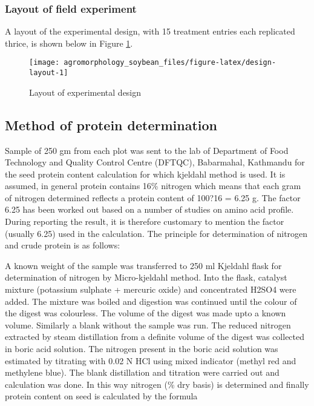 \documentclass[
]{article}
\begin{document}
\hypertarget{layout-of-field-experiment}{%
\subsubsection{Layout of field experiment}\label{layout-of-field-experiment}}

A layout of the experimental design, with 15 treatment entries each replicated thrice, is shown below in Figure \ref{fig:design-layout}.

\begin{figure}

{\centering \texttt{[image: agromorphology\_soybean\_files/figure-latex/design-layout-1]} 

}

\caption{Layout of experimental design}\label{fig:design-layout}
\end{figure}

\hypertarget{method-of-protein-determination}{%
\subsection{Method of protein determination}\label{method-of-protein-determination}}

Sample of 250 gm from each plot was sent to the lab of Department of Food Technology and Quality Control Centre (DFTQC), Babarmahal, Kathmandu for the seed protein content calculation for which kjeldahl method is used. It is assumed, in general protein contains 16\% nitrogen which means that each gram of nitrogen determined reflects a protein content of 100?16 = 6.25 g. The factor 6.25 has been worked out based on a number of studies on amino acid profile. During reporting the result, it is therefore customary to mention the factor (usually 6.25) used in the calculation. The principle for determination of nitrogen and crude protein is as follows:

A known weight of the sample was transferred to 250 ml Kjeldahl flask for determination of nitrogen by Micro-kjeldahl method. Into the flask, catalyst mixture (potassium sulphate + mercuric oxide) and concentrated H2SO4 were added. The mixture was boiled and digestion was continued until the colour of the digest was colourless. The volume of the digest was made upto a known volume. Similarly a blank without the sample was run. The reduced nitrogen extracted by steam distillation from a definite volume of the digest was collected in boric acid solution. The nitrogen present in the boric acid solution was estimated by titrating with 0.02 N HCl using mixed indicator (methyl red and methylene blue). The blank distillation and titration were carried out and calculation was done. In this way nitrogen (\% dry basis) is determined and finally protein content on seed is calculated by the formula
\end{document}
